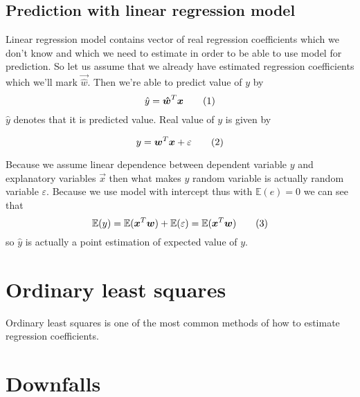 \subsection{Prediction with linear regression model}
Linear regression model contains vector of real regression coefficients which we don't know and which we need to estimate in order to be able to use model for prediction. So let us assume that we already have estimated regression coefficients which we'll mark $\vec{\hat{w}}$. Then we're able to predict value of $y$ by
\[
    \hat{y} = \vec{\hat{w}}^T\vec{x} \numberthis
\]
$\hat{y}$ denotes that it is predicted value. Real value of $y$ is given by 

\[
    y = \vec{w}^T\vec{x} + \varepsilon \numberthis
\]

Because we assume linear dependence between dependent variable $y$ and explanatory variables $\vec{x}$ then what makes $y$ random variable is actually random variable $\varepsilon$. Because we use model with intercept thus with $\mathbb{E}(e) = 0$ we can see that 
\[
\mathbb{E}(y) =\mathbb{E}(\vec{x}^T\vec{w}) + \mathbb{E}(\varepsilon) = \mathbb{E}(\vec{x}^T\vec{w})
\numberthis
\]
so $\hat{y}$ is actually a point estimation of expected value of $y$.

\section{Ordinary least squares}
Ordinary least squares is one of the most common methods of how to estimate regression coefficients.

\section{Downfalls}